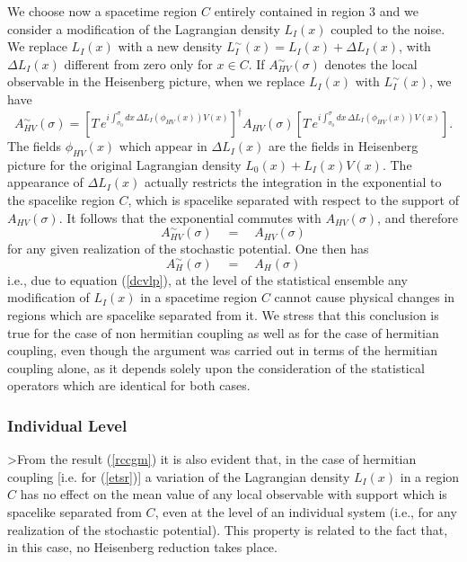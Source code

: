 \documentclass[12pt]{article}
\begin{document}
We choose now a spacetime region $C$ entirely contained in region
3 and we consider a modification of the Lagrangian density
$L_{I}(x)$ coupled to the noise. We replace $L_{I}(x)$ with a new
density $L_{I}^{\sim}(x) = L_{I}(x) + \Delta L_{I}(x)$, with
$\Delta L_{I}(x)$ different from zero only for $x \in C$. If
$A_{HV}^{\sim}(\sigma)$ denotes the local observable in the
Heisenberg picture, when we replace $L_{I}(x)$ with
$L_{I}^{\sim}(x)$, we have
\begin{equation}
A_{HV}^{\sim}(\sigma) = \left[ T\,e^{ i\int_{\sigma_{0}}^{\sigma}
dx\, \Delta L_{I}(\phi_{HV}(x)) V(x)} \right]^{\dagger}
A_{HV}(\sigma) \left[ T\,e^{ i\int_{\sigma_{0}}^{\sigma} dx\,
\Delta L_{I}(\phi_{HV}(x)) V(x)} \right].
\end{equation}
The fields $\phi_{HV}(x)$ which appear in $\Delta L_{I}(x)$ are
the fields in Heisenberg picture for the original Lagrangian
density $L_{0}(x) + L_{I}(x) V(x)$. The appearance of $\Delta
L_{I}(x)$ actually restricts the integration in the exponential to
the spacelike region $C$, which is spacelike separated with
respect to the support of $A_{HV}(\sigma)$. It follows that the
exponential commutes with $A_{HV}(\sigma)$, and therefore
\begin{equation} \label{rccgm}
A_{HV}^{\sim}(\sigma) \quad = \quad A_{HV}(\sigma)
\end{equation}
for any given realization of the stochastic potential. One then
has
\begin{equation}
A_{H}^{\sim}(\sigma) \quad = \quad A_{H}(\sigma)
\end{equation}
i.e., due to equation (\ref{dcvlp}), at the level of the
statistical ensemble any modification of $L_{I}(x)$ in a spacetime
region $C$ cannot cause physical changes in regions which are
spacelike separated from it. We stress that this conclusion is
true for the case of non hermitian coupling as well as for the
case of hermitian coupling, even though the argument was carried
out in terms of the hermitian coupling alone, as it depends solely
upon the consideration of the statistical operators which are
identical for both cases.

\subsubsection{Individual Level} \label{sec1022}

>From the result (\ref{rccgm}) it is also evident that, in the case
of hermitian coupling [i.e. for (\ref{etsr})] a variation of the
Lagrangian density $L_{I}(x)$ in a region $C$ has no effect on the
mean value of any local observable with support which is spacelike
separated from $C$, even at the level of an individual system
(i.e., for any realization of the stochastic potential). This
property is related to the fact that, in this case, no Heisenberg
reduction takes place.
\end{document}

